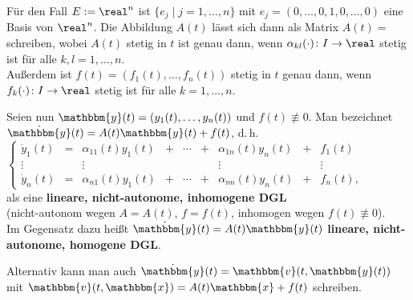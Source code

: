 \linie

Für den Fall $E := \real^n$ ist $\{e_j \;|\; j = 1, \dotsc, n\}$ mit
$e_j = (0, \dotsc, 0, 1, 0, \dotsc, 0)$ eine Basis von $\real^n$.
Die Abbildung $A(t)$ lässt sich dann als Matrix
$A(t) =$  schreiben, wobei $A(t)$ stetig in $t$ ist genau dann, wenn
$\alpha_{kl}(\cdot)\colon I \rightarrow \real$ stetig ist für alle
$k, l = 1, \dotsc, n$. \\
Außerdem ist $f(t) = (f_1(t), \dotsc, f_n(t))$ stetig in $t$ genau dann,
wenn $f_k(\cdot)\colon I \rightarrow \real$ stetig ist für
alle $k = 1, \dotsc, n$.

Seien nun $\mathbbm{y}(t) = (y_1(t), \dotsc, y_n(t))$
und $f(t) \not\equiv 0$.
Man bezeichnet $\dot{\mathbbm{y}}(t) = A(t) \mathbbm{y}(t) + f(t)$, d.\,h. \\
$\left\{\begin{array}{ccccccccc}
\dot{y}_1(t) & = & \alpha_{11}(t) y_1(t) & + & \dotsb & + &
\alpha_{1n}(t) y_n(t) & + & f_1(t) \\
\vdots & & \vdots & & & & \vdots & & \vdots \\
\dot{y}_n(t) & = & \alpha_{n1}(t) y_1(t) & + & \dotsb & + &
\alpha_{nn}(t) y_n(t) & + & f_n(t),
\end{array}\right.$ \\
als eine \textbf{lineare, nicht-autonome, inhomogene DGL} \\
(nicht-autonom wegen $A = A(t)$, $f = f(t)$,
inhomogen wegen $f(t) \not\equiv 0$). \\
Im Gegensatz dazu heißt $\dot{\mathbbm{y}}(t) = A(t) \mathbbm{y}(t)$
\textbf{lineare, nicht-autonome, homogene DGL}.

Alternativ kann man auch $\dot{\mathbbm{y}}(t) =
\mathbbm{v}(t, \mathbbm{y}(t))$
mit $\mathbbm{v}(t, \mathbbm{x}) = A(t) \mathbbm{x} + f(t)$ schreiben.

\linie


